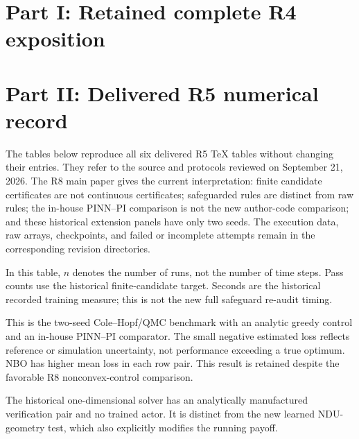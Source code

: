 \documentclass[ecta]{econsocart}
\renewcommand{\[}{\begingroup\small\ROpenDisplay}
\renewcommand{\]}{\RCloseDisplay\endgroup}
\theoremstyle{remark}
\begin{document}
\clearpage
\section*{Part I: Retained complete R4 exposition}

\begin{appendix}

\end{appendix}
\clearpage
\section*{Part II: Delivered R5 numerical record}
The tables below reproduce all six delivered R5 TeX tables without changing their entries. They refer to the source and protocols reviewed on September 21, 2026. The R8 main paper gives the current interpretation: finite candidate certificates are not continuous certificates; safeguarded rules are distinct from raw rules; the in-house PINN--PI comparison is not the new author-code comparison; and these historical extension panels have only two seeds. The execution data, raw arrays, checkpoints, and failed or incomplete attempts remain in the corresponding revision directories.

\begin{table}[htbp]\centering\small
\caption{Retained R5 NDU panel}

\par\smallskip\footnotesize In this table, $n$ denotes the number of runs, not the number of time steps. Pass counts use the historical finite-candidate target. Seconds are the historical recorded training measure; this is not the new full safeguard re-audit timing.
\end{table}

\begin{table}[htbp]\centering\small
\caption{Retained R5 quadratic-control comparison}

\par\smallskip\footnotesize This is the two-seed Cole--Hopf/QMC benchmark with an analytic greedy control and an in-house PINN--PI comparator. The small negative estimated loss reflects reference or simulation uncertainty, not performance exceeding a true optimum. NBO has higher mean loss in each row pair. This result is retained despite the favorable R8 nonconvex-control comparison.
\end{table}

\begin{table}[htbp]\centering\small
\caption{Retained R5 manufactured stopped-diffusion test}

\par\smallskip\footnotesize The historical one-dimensional solver has an analytically manufactured verification pair and no trained actor. It is distinct from the new learned NDU-geometry test, which also explicitly modifies the running payoff.
\end{table}
\end{document}
